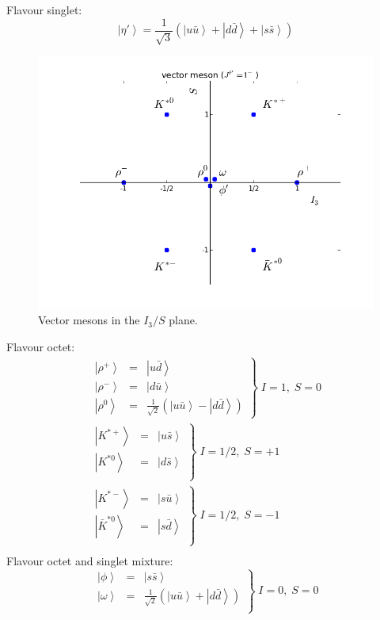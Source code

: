 \documentclass[12pt]{article}
\begin{document}
Flavour singlet:
\[\left|\eta'\right>=\frac{1}{\sqrt{3}}\left(\left|u\bar u\right>+\left|d\bar d\right>+\left|s\bar s\right>\right)\]
\clearpage
\begin{figure}[h]
\includegraphics[scale=0.75]{images/MesonOctetJ1.png}
\caption{Vector mesons in the $I_3/S$ plane.}\label{fig:mesonOctetJ1}
\end{figure}
Flavour octet:
\[\begin{array}{l}
\left.\begin{array}{ccc}
\left|\rho^+\right>&=&\left|u\bar d\right>\\
\left|\rho^-\right>&=&\left|d\bar u\right>\\
\left|\rho^0\right>&=&\frac{1}{\sqrt{2}}\left(\left|u\bar u\right>-\left|d\bar d\right>\right)
\end{array}
\right\} \; I=1,\;S=0\\
\left.\begin{array}{ccc}
\left|K^{*+}\right>&=&\left|u\bar s\right>\\
\left|K^{*0}\right>&=&\left|d\bar s\right>\\
\end{array}
\right\}\;  I=1/2,\;S=+1\\
\left.\begin{array}{ccc}
\left|K^{*-}\right>&=&\left|s\bar u\right>\\
\left|\bar K^{*0}\right>&=&\left|s\bar d\right>\\
\end{array}
\right\}\; I=1/2,\;S=-1\\
\end{array}
\]
Flavour octet and singlet mixture:
\[
\left.\begin{array}{ccc}
\left|\phi\right>&=&\left|s\bar s\right>\\
\left|\omega\right>&=&\frac{1}{\sqrt{2}}\left(\left|u\bar u\right>+\left|d\bar d\right>\right)\\
\end{array}
\right\}\; I=0,\;S=0
\]
\clearpage
\end{document}
